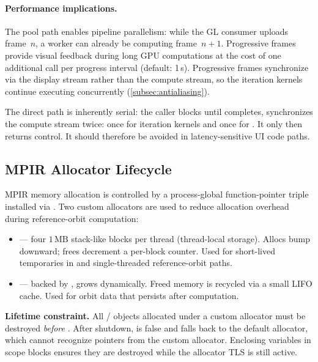 \paragraph{Performance implications.}
The pool path enables pipeline parallelism: while the GL consumer
uploads frame~$n$, a worker can already be computing frame~$n\!+\!1$.
Progressive frames provide visual feedback during long GPU
computations at the cost of one additional 
call per progress interval (default: 1\,s).  Progressive frames
synchronize via the display stream rather than the compute stream,
so the iteration kernels continue executing concurrently
(\cref{subsec:antialiasing}).

The direct path is inherently serial: the caller blocks until
 completes, synchronizes the compute stream
twice: once for iteration kernels and once for . It
only then returns control. It should therefore be avoided in
latency-sensitive UI code paths.

\subsection{MPIR Allocator Lifecycle}
\label{subsec:mpir-allocator-lifecycle}

MPIR memory allocation is controlled by a process-global function-pointer
triple installed via .  Two custom allocators
are used to reduce allocation overhead during reference-orbit computation:

\begin{itemize}
  \item \textbf{} --- four $1\,\mathrm{MB}$
        stack-like blocks per thread (thread-local storage).  Allocs bump
        downward; frees decrement a per-block counter.  Used for short-lived
        temporaries in  and single-threaded reference-orbit
        paths.
  \item \textbf{} --- backed by
        , grows dynamically.  Freed memory is
        recycled via a small LIFO cache.  Used for  orbit
        data that persists after computation.
\end{itemize}

\textbf{Lifetime constraint.}  All  /  objects
allocated under a custom allocator must be destroyed \emph{before}
.  After shutdown,  is false and
 falls back to the default allocator, which cannot recognize
pointers from the custom allocator.  Enclosing  variables in
\code{\{\,\}} scope blocks ensures they are destroyed while the allocator TLS
is still active.


